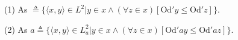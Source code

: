 (1) As $\triangleq \{\langle x, y \rangle \in L^2 | y \in x \land (\forall z \in x)[\text{Od}' y \leq \text{Od}' z]\}.$

(2) As $a \triangleq \{\langle x, y \rangle \in L_a^2 | y \in x \land (\forall z \in x)[\text{Od}' a y \leq \text{Od}' a z]\}.$
